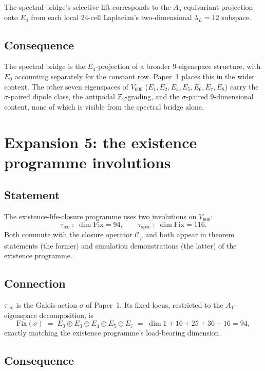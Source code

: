 \documentclass[11pt,a4paper]{article}
\theoremstyle{definition}
\theoremstyle{remark}
\newcommand{\CC}{\mathcal{C}}
\begin{document}
The spectral bridge's selective lift corresponds to the
$A_5$-equivariant projection onto $E_4$ from each local
$24$-cell Laplacian's two-dimensional $\lambda_L = 12$ subspace.

\subsection*{Consequence}

The spectral bridge is the $E_4$-projection of a broader $9$-eigenspace
structure, with $E_0$ accounting separately for the constant row.
Paper~1 places this in the wider context. The other seven eigenspaces of
$V_{600}$ ($E_1, E_2, E_3, E_5, E_6, E_7, E_8$) carry the $\sigma$-paired
dipole class, the antipodal $\mathbb{Z}_2$-grading, and the
$\sigma$-paired $9$-dimensional content, none of which is visible from
the spectral bridge alone.

\bigskip

\section{Expansion 5: the existence programme involutions}\label{sec:existence}

\subsection*{Statement}

The existence-life-closure programme \cite{existenceClosure,lifeAsClosure}
uses two involutions on $V_{600}$:
\[
  \tau_\mathrm{ico} \;:\; \dim \mathrm{Fix} = 94, \qquad
  \tau_\mathrm{spec} \;:\; \dim \mathrm{Fix} = 116.
\]
Both commute with the closure operator $\CC_\varphi$ and both appear in
theorem statements (the former) and simulation demonstrations (the latter)
of the existence programme.

\subsection*{Connection}

$\tau_\mathrm{ico}$ is the Galois action $\sigma$ of Paper~1. Its fixed
locus, restricted to the $A_1$-eigenspace decomposition, is
\[
  \mathrm{Fix}(\sigma) \;=\; E_0 \oplus E_3 \oplus E_4 \oplus E_5 \oplus E_7
  \;=\; \dim 1 + 16 + 25 + 36 + 16 = 94,
\]
exactly matching the existence programme's load-bearing dimension.

\subsection*{Consequence}
\end{document}
